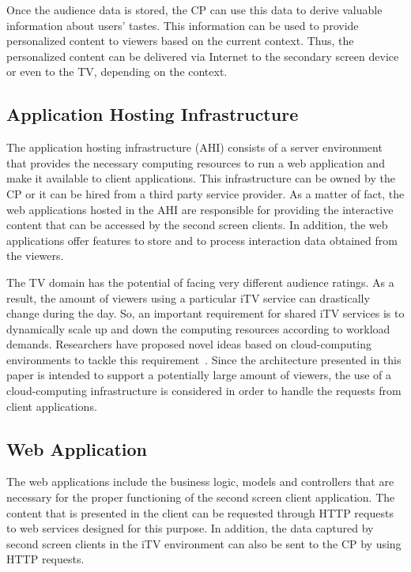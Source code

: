 \documentclass[journal]{IEEEtran}
\begin{document}
Once the audience data is stored, the CP can use this data to derive valuable information about users' tastes. This information can be used to provide personalized content to viewers based on the current context. Thus, the personalized content can be delivered via Internet to the secondary screen device or even to the TV, depending on the context.

\subsection{Application Hosting Infrastructure}

The application hosting infrastructure (AHI) consists of a server environment that provides the necessary computing resources to run a web application and make it available to client applications. This infrastructure can be owned by the CP or it can be hired from a third party service provider. As a matter of fact, the web applications hosted in the AHI are responsible for providing the interactive content that can be accessed by the second screen clients. In addition, the web applications offer features to store and to process interaction data obtained from the viewers.

The TV domain has the potential of facing very different audience ratings. As a result, the amount of viewers using a particular iTV service can drastically change during the day. So, an important requirement for shared iTV services is to dynamically scale up and down the computing resources according to workload demands. Researchers have proposed novel ideas based on cloud-computing environments to tackle this requirement~\cite{Lee2010,Lai2011}. Since the architecture presented in this paper is intended to support a potentially large amount of viewers, the use of a cloud-computing infrastructure is considered in order to handle the requests from client applications.

\subsection{Web Application}
\label{ssub_web_application}

The web applications include the business logic, models and controllers that are necessary for the proper functioning of the second screen client application. The content that is presented in the client can be requested through HTTP requests to web services designed for this purpose. In addition, the data captured by second screen clients in the iTV environment can also be sent to the CP by using HTTP requests. 
\end{document}
